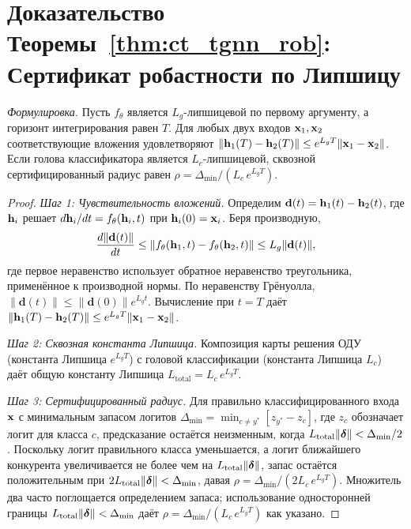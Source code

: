 \section{Доказательство Теоремы~\ref{thm:ct_tgnn_rob}: Сертификат робастности по Липшицу}
\label{app:proof_ct_rob}

\noindent\textit{Формулировка.} Пусть $f_\theta$ является $L_g$-липшицевой по первому аргументу, а горизонт интегрирования равен $T$. Для любых двух входов $\mathbf{x}_1,\mathbf{x}_2$ соответствующие вложения удовлетворяют $\|\mathbf{h}_1(T)-\mathbf{h}_2(T)\|\le e^{L_g T}\|\mathbf{x}_1-\mathbf{x}_2\|$. Если голова классификатора является $L_c$-липшицевой, сквозной сертифицированный радиус равен $\rho = \Delta_{\min}/(L_c\,e^{L_g T})$.

\begin{proof}
\textit{Шаг 1: Чувствительность вложений.} Определим $\mathbf{d}(t) = \mathbf{h}_1(t)-\mathbf{h}_2(t)$, где $\mathbf{h}_i$ решает $d\mathbf{h}_i/dt = f_\theta(\mathbf{h}_i,t)$ при $\mathbf{h}_i(0)=\mathbf{x}_i$. Беря производную,
\begin{equation}
\frac{d\|\mathbf{d}(t)\|}{dt}
\le \|f_\theta(\mathbf{h}_1,t)-f_\theta(\mathbf{h}_2,t)\|
\le L_g\|\mathbf{d}(t)\|,
\end{equation}
где первое неравенство использует обратное неравенство треугольника, применённое к производной нормы. По неравенству Грёнуолла, $\|\mathbf{d}(t)\|\le\|\mathbf{d}(0)\|e^{L_g t}$. Вычисление при $t=T$ даёт $\|\mathbf{h}_1(T)-\mathbf{h}_2(T)\|\le e^{L_g T}\|\mathbf{x}_1-\mathbf{x}_2\|$.

\textit{Шаг 2: Сквозная константа Липшица.} Композиция карты решения ОДУ (константа Липшица $e^{L_g T}$) с головой классификации (константа Липшица $L_c$) даёт общую константу Липшица $L_{\mathrm{total}} = L_c\,e^{L_g T}$.

\textit{Шаг 3: Сертифицированный радиус.} Для правильно классифицированного входа $\mathbf{x}$ с минимальным запасом логитов $\Delta_{\min}=\min_{c\neq y^*}[z_{y^*}-z_c]$, где $z_c$ обозначает логит для класса $c$, предсказание остаётся неизменным, когда $L_{\mathrm{total}}\|\boldsymbol{\delta}\|<\Delta_{\min}/2$. Поскольку логит правильного класса уменьшается, а логит ближайшего конкурента увеличивается не более чем на $L_{\mathrm{total}}\|\boldsymbol{\delta}\|$, запас остаётся положительным при $2L_{\mathrm{total}}\|\boldsymbol{\delta}\|<\Delta_{\min}$, давая $\rho = \Delta_{\min}/(2L_c\,e^{L_g T})$. Множитель два часто поглощается определением запаса; использование односторонней границы $L_{\mathrm{total}}\|\boldsymbol{\delta}\|<\Delta_{\min}$ даёт $\rho = \Delta_{\min}/(L_c\,e^{L_g T})$ как указано.
\end{proof}


